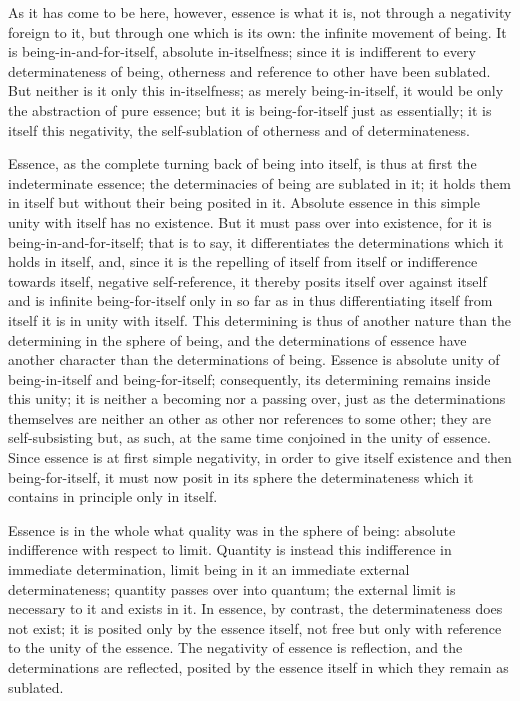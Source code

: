 As it has come to be here, however,
essence is what it is,
not through a negativity foreign to it,
but through one which is its own:
the infinite movement of being.
It is being-in-and-for-itself,
absolute in-itselfness;
since it is indifferent to every determinateness of being,
otherness and reference to other have been sublated.
But neither is it only this in-itselfness;
as merely being-in-itself, it would be only the abstraction of pure essence;
but it is being-for-itself just as essentially;
it is itself this negativity,
the self-sublation of otherness and of determinateness.

Essence, as the complete turning back of being into itself,
is thus at first the indeterminate essence;
the determinacies of being are sublated in it;
it holds them in itself but without their being posited in it.
Absolute essence in this simple unity with itself has no existence.
But it must pass over into existence, for it is being-in-and-for-itself;
that is to say, it differentiates the determinations which it holds in itself,
and, since it is the repelling of itself from itself
or indifference towards itself, negative self-reference,
it thereby posits itself over against itself
and is infinite being-for-itself
only in so far as in thus
differentiating itself from itself
it is in unity with itself.
This determining is thus of another nature than
the determining in the sphere of being,
and the determinations of essence have another character
than the determinations of being.
Essence is absolute unity of being-in-itself and being-for-itself;
consequently, its determining remains inside this unity;
it is neither a becoming nor a passing over,
just as the determinations themselves are
neither an other as other nor references to some other;
they are self-subsisting but, as such,
at the same time conjoined in the unity of essence.
Since essence is at first simple negativity,
in order to give itself existence and then being-for-itself,
it must now posit in its sphere the determinateness
which it contains in principle only in itself.

Essence is in the whole what quality was in the sphere of being:
absolute indifference with respect to limit.
Quantity is instead this indifference in immediate determination,
limit being in it an immediate external determinateness;
quantity passes over into quantum;
the external limit is necessary to it and exists in it.
In essence, by contrast, the determinateness does not exist;
it is posited only by the essence itself,
not free but only with reference to
the unity of the essence.
The negativity of essence is reflection,
and the determinations are reflected,
posited by the essence itself
in which they remain as sublated.

